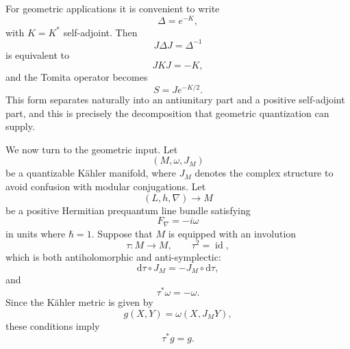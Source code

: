 \documentclass[a4paper,11pt]{article}
\theoremstyle{definition}
\begin{document}
For geometric applications it is convenient to write
\begin{equation}
    \Delta=e^{-K},
\end{equation}
with $K=K^*$ self-adjoint.  Then
\begin{equation}
    J\Delta J=\Delta^{-1}
\end{equation}
is equivalent to
\begin{equation}
    JKJ=-K,
    \label{eq:ssgq:JKJ}
\end{equation}
and the Tomita operator becomes
\begin{equation}
    S
    =
    Je^{-K/2}.
    \label{eq:ssgq:SJK}
\end{equation}
This form separates naturally into an antiunitary part and a positive
self-adjoint part, and this is precisely the decomposition that geometric
quantization can supply.

We now turn to the geometric input.  Let
\begin{equation}
    (M,\omega,J_M)
\end{equation}
be a quantizable K\"ahler manifold, where $J_M$ denotes the complex structure
to avoid confusion with modular conjugations.  Let
\begin{equation}
    (L,h,\nabla)\longrightarrow M
\end{equation}
be a positive Hermitian prequantum line bundle satisfying
\begin{equation}
    F_\nabla=-i\omega
\end{equation}
in units where $\hbar=1$.  Suppose that $M$ is equipped with an involution
\begin{equation}
    \tau:M\rightarrow M,
    \qquad
    \tau^2=\operatorname{id},
\end{equation}
which is both antiholomorphic and anti-symplectic:
\begin{equation}
    \mathrm{d}\tau\circ J_M
    =
    -J_M\circ\mathrm{d}\tau,
    \label{eq:ssgq:tauAntiholo}
\end{equation}
and
\begin{equation}
    \tau^*\omega=-\omega.
    \label{eq:ssgq:tauAntisymp}
\end{equation}
Since the K\"ahler metric is given by
\begin{equation}
    g(X,Y)=\omega(X,J_MY),
\end{equation}
these conditions imply
\begin{equation}
    \tau^*g=g.
\end{equation}
\end{document}
